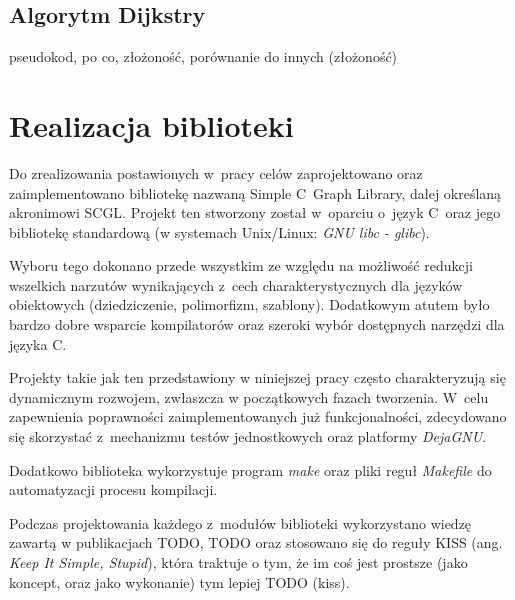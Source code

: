 \documentclass[a4paper,12pt,polish,oneside]{thesis}
\begin{document}
\section{Algorytm Dijkstry}
pseudokod, po co, złożoność, porównanie do innych (złożoność)




\chapter{Realizacja biblioteki}
Do zrealizowania postawionych w~pracy celów zaprojektowano oraz zaimplementowano bibliotekę nazwaną Simple C~Graph Library, dalej określaną akronimowi SCGL.
Projekt ten stworzony został w~oparciu o~język C~oraz jego bibliotekę standardową (w systemach Unix/Linux: \emph{GNU libc - glibc}).

Wyboru tego dokonano przede wszystkim ze względu na możliwość redukcji wszelkich narzutów wynikających z~cech charakterystycznych dla języków obiektowych (dziedziczenie, polimorfizm, szablony).
Dodatkowym atutem było bardzo dobre wsparcie kompilatorów oraz szeroki wybór dostępnych narzędzi dla języka C.

Projekty takie jak ten przedstawiony w niniejszej pracy często charakteryzują się dynamicznym rozwojem, zwłaszcza w początkowych fazach tworzenia.
W~celu zapewnienia poprawności zaimplementowanych już funkcjonalności, zdecydowano się skorzystać z~mechanizmu testów jednostkowych oraz platformy \emph{DejaGNU}.

Dodatkowo biblioteka wykorzystuje program \emph{make} oraz pliki reguł \emph{Makefile} do automatyzacji procesu kompilacji.

Podczas projektowania każdego z~modułów biblioteki wykorzystano wiedzę zawartą w publikacjach TODO, TODO oraz stosowano się do reguły KISS (ang. \emph{Keep It Simple, Stupid}), która traktuje o tym, że im coś jest prostsze (jako koncept, oraz jako wykonanie) tym lepiej TODO (kiss).
\end{document}
